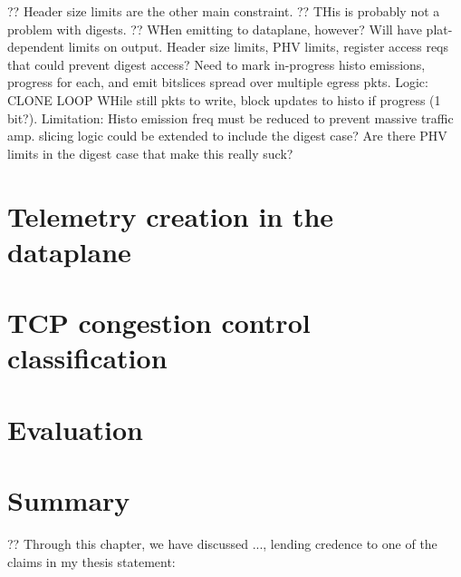 ?? Header size limits are the other main constraint.
?? THis is probably not a problem with digests.
?? WHen emitting to dataplane, however? Will have plat-dependent limits on output. Header size limits, PHV limits, register access reqs that could prevent digest access? Need to mark in-progress histo emissions, progress for each, and emit bitslices spread over multiple egress pkts. Logic: CLONE LOOP WHile still pkts to write, block updates to histo if progress (1 bit?). Limitation: Histo emission freq must be reduced to prevent massive traffic amp. slicing logic could be extended to include the digest case? Are there PHV limits in the digest case that make this really suck?

%

\section{Telemetry creation in the dataplane}\label{sec:seidr-architecture}


\section{TCP congestion control classification}\label{sec:seidr-tcpcc}


\section{Evaluation}\label{sec:seidr-evaluation}


% 

\section{Summary}\label{sec:seidr-conclustion}


?? Through this chapter, we have discussed ..., lending credence to one of the claims in my thesis statement: 
